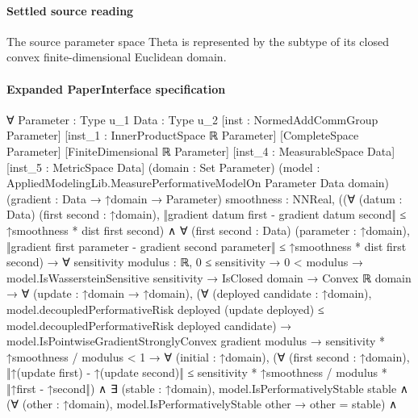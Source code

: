 \documentclass[10pt]{article}
\begin{document}
\paragraph{Settled source reading}
\begin{sloppypar}
The source parameter space Theta is represented by the subtype of its closed convex finite-\allowbreak{}dimensional Euclidean domain.\allowbreak{}
\end{sloppypar}

\paragraph{Expanded PaperInterface specification}
\begin{ReviewVerbatim}
∀ {Parameter : Type u_1} {Data : Type u_2} [inst : NormedAddCommGroup Parameter]
  [inst_1 : InnerProductSpace ℝ Parameter] [CompleteSpace Parameter] [FiniteDimensional ℝ Parameter]
  [inst_4 : MeasurableSpace Data] [inst_5 : MetricSpace Data] (domain : Set Parameter)
  (model : AppliedModelingLib.MeasurePerformativeModelOn Parameter Data domain) (gradient : Data → ↑domain → Parameter)
  {smoothness : NNReal},
  ((∀ (datum : Data) (first second : ↑domain),
        ‖gradient datum first - gradient datum second‖ ≤ ↑smoothness * dist first second) ∧
      ∀ (first second : Data) (parameter : ↑domain),
        ‖gradient first parameter - gradient second parameter‖ ≤ ↑smoothness * dist first second) →
    ∀ {sensitivity modulus : ℝ},
      0 ≤ sensitivity →
        0 < modulus →
          model.IsWassersteinSensitive sensitivity →
            IsClosed domain →
              Convex ℝ domain →
                ∀ (update : ↑domain → ↑domain),
                  (∀ (deployed candidate : ↑domain),
                      model.decoupledPerformativeRisk deployed (update deployed) ≤
                        model.decoupledPerformativeRisk deployed candidate) →
                    model.IsPointwiseGradientStronglyConvex gradient modulus →
                      sensitivity * ↑smoothness / modulus < 1 →
                        ∀ (initial : ↑domain),
                          (∀ (first second : ↑domain),
                              ‖↑(update first) - ↑(update second)‖ ≤
                                sensitivity * ↑smoothness / modulus * ‖↑first - ↑second‖) ∧
                            ∃ (stable : ↑domain),
                              model.IsPerformativelyStable stable ∧
                                (∀ (other : ↑domain), model.IsPerformativelyStable other → other = stable) ∧

\end{ReviewVerbatim}
\end{document}
